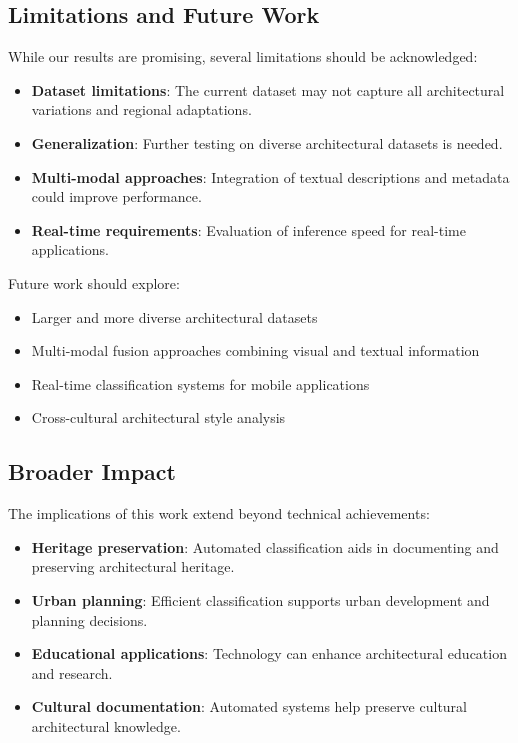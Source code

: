 \documentclass[conference]{IEEEtran}
\begin{document}
\subsection{Limitations and Future Work}

While our results are promising, several limitations should be acknowledged:

\begin{itemize}
    \item \textbf{Dataset limitations}: The current dataset may not capture all architectural variations and regional adaptations.
    \item \textbf{Generalization}: Further testing on diverse architectural datasets is needed.
    \item \textbf{Multi-modal approaches}: Integration of textual descriptions and metadata could improve performance.
    \item \textbf{Real-time requirements}: Evaluation of inference speed for real-time applications.
\end{itemize}

Future work should explore:

\begin{itemize}
    \item Larger and more diverse architectural datasets
    \item Multi-modal fusion approaches combining visual and textual information
    \item Real-time classification systems for mobile applications
    \item Cross-cultural architectural style analysis
\end{itemize}

\subsection{Broader Impact}

The implications of this work extend beyond technical achievements:

\begin{itemize}
    \item \textbf{Heritage preservation}: Automated classification aids in documenting and preserving architectural heritage.
    \item \textbf{Urban planning}: Efficient classification supports urban development and planning decisions.
    \item \textbf{Educational applications}: Technology can enhance architectural education and research.
    \item \textbf{Cultural documentation}: Automated systems help preserve cultural architectural knowledge.
\end{itemize}
\end{document}
